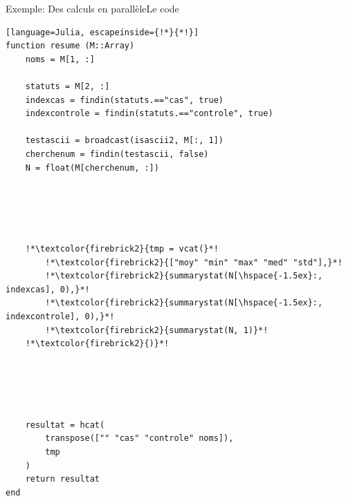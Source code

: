 \begin{frame}[containsverbatim]{\textcolor{goldenrod2}{Exemple:} Des calculs en parallèle}{Le code}
\vspace{-1ex}
\begin{lstlisting}[language=Julia, escapeinside={!*}{*!}]
function resume (M::Array)
    noms = M[1, :]

    statuts = M[2, :]
    indexcas = findin(statuts.=="cas", true)
    indexcontrole = findin(statuts.=="controle", true)

    testascii = broadcast(isascii2, M[:, 1])
    cherchenum = findin(testascii, false)
    N = float(M[cherchenum, :])





    !*\textcolor{firebrick2}{tmp = vcat(}*!
        !*\textcolor{firebrick2}{["moy" "min" "max" "med" "std"],}*!
        !*\textcolor{firebrick2}{summarystat(N[\hspace{-1.5ex}:, indexcas], 0),}*!
        !*\textcolor{firebrick2}{summarystat(N[\hspace{-1.5ex}:, indexcontrole], 0),}*!
        !*\textcolor{firebrick2}{summarystat(N, 1)}*!
    !*\textcolor{firebrick2}{)}*!





    resultat = hcat(
        transpose(["" "cas" "controle" noms]),
        tmp
    )
    return resultat
end
\end{lstlisting}
\end{frame}


